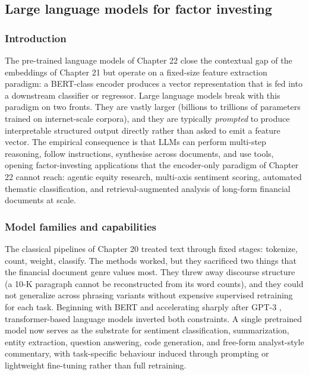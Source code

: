 \subsection{Large language models for factor investing}

% 
%

\subsubsection{Introduction}

The pre-trained language models of Chapter 22 close the contextual gap of the embeddings of Chapter 21 but operate on a fixed-size feature extraction paradigm: a BERT-class encoder produces a vector representation that is fed into a downstream classifier or regressor. Large language models break with this paradigm on two fronts. They are vastly larger (billions to trillions of parameters trained on internet-scale corpora), and they are typically \textit{prompted} to produce interpretable structured output directly rather than asked to emit a feature vector. The empirical consequence is that LLMs can perform multi-step reasoning, follow instructions, synthesise across documents, and use tools, opening factor-investing applications that the encoder-only paradigm of Chapter 22 cannot reach: agentic equity research, multi-axis sentiment scoring, automated thematic classification, and retrieval-augmented analysis of long-form financial documents at scale.

\subsubsection{Model families and capabilities}

The classical pipelines of Chapter 20 treated text through fixed stages: tokenize, count, weight, classify. The methods worked, but they sacrificed two things that the financial document genre values most. They threw away discourse structure (a 10-K paragraph cannot be reconstructed from its word counts), and they could not generalize across phrasing variants without expensive supervised retraining for each task. Beginning with BERT \citep{devlin2019bert} and accelerating sharply after GPT-3 \citep{brown2020language}, transformer-based language models inverted both constraints. A single pretrained model now serves as the substrate for sentiment classification, summarization, entity extraction, question answering, code generation, and free-form analyst-style commentary, with task-specific behaviour induced through prompting or lightweight fine-tuning rather than full retraining.


